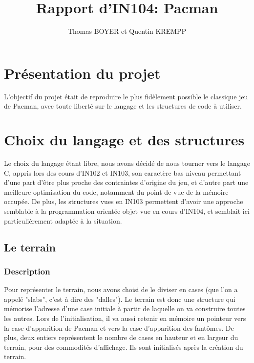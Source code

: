 \documentclass[a4paper,11pt]{article}
\begin{document}
\title{Rapport d'IN104: Pacman}
\author{Thomas BOYER et Quentin KREMPP}
\maketitle

\tableofcontents

\section{Présentation du projet}

    L'objectif du projet était de reproduire le plus fidèlement possible le classique jeu de Pacman, avec toute liberté sur le langage et les structures de code à utiliser.

\section{Choix du langage et des structures}

    Le choix du langage étant libre, nous avons décidé de nous tourner vers le langage C, appris lors des cours d'IN102 et IN103, son caractère bas niveau permettant d'une part d'être plus proche des contraintes d'origine du jeu, et d'autre part une meilleure optimisation du code, notamment du point de vue de la mémoire occupée. De plus, les structures vues en IN103 permettent d'avoir une approche semblable à la programmation orientée objet vue en cours d'IN104, et semblait ici particulièrement adaptée à la situation.

    \subsection{Le terrain}

    \subsubsection{Description}

    Pour représenter le terrain, nous avons choisi de le diviser en cases (que l'on a appelé "slabs", c'est à dire des "dalles"). Le terrain est donc une structure qui mémorise l'adresse d'une case initiale à partir de laquelle on va construire toutes les autres. Lors de l'initialisation, il va aussi retenir en mémoire un pointeur vers la case d'apparition de Pacman et vers la case d'apparition des fantômes. De plus, deux entiers représentent le nombre de cases en hauteur et en largeur du terrain, pour des commodités d'affichage. Ils sont initialisés après la création du terrain.
\end{document}
